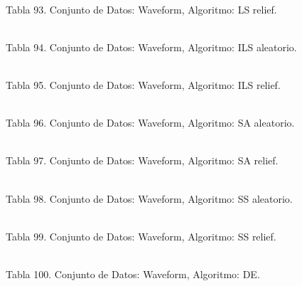 \documentclass{ci5652}
\begin{document}
%
\\
Tabla 93. Conjunto de Datos: Waveform, Algoritmo: LS relief.

%
\\
Tabla 94. Conjunto de Datos: Waveform, Algoritmo: ILS aleatorio.

%
\\
Tabla 95. Conjunto de Datos: Waveform, Algoritmo: ILS relief.

%
\\
Tabla 96. Conjunto de Datos: Waveform, Algoritmo: SA aleatorio.

%
\\
Tabla 97. Conjunto de Datos: Waveform, Algoritmo: SA relief.

%
\\
Tabla 98. Conjunto de Datos: Waveform, Algoritmo: SS aleatorio.

%
\\
Tabla 99. Conjunto de Datos: Waveform, Algoritmo: SS relief.

%
\\
Tabla 100. Conjunto de Datos: Waveform, Algoritmo: DE.
\end{document}
